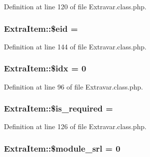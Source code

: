 Definition at line 120 of file Extravar.\+class.\+php.

\subsubsection[{\texorpdfstring{\$eid}{$eid}}]{\setlength{\rightskip}{0pt plus 5cm}Extra\+Item\+::\$eid = \textquotesingle{}\textquotesingle{}}\hypertarget{classExtraItem_a8a68f26bb602679ebf4095e774425092}{}\label{classExtraItem_a8a68f26bb602679ebf4095e774425092}


Definition at line 144 of file Extravar.\+class.\+php.

\subsubsection[{\texorpdfstring{\$idx}{$idx}}]{\setlength{\rightskip}{0pt plus 5cm}Extra\+Item\+::\$idx = 0}\hypertarget{classExtraItem_aadcda4aa903481b261d86bc50ab1c238}{}\label{classExtraItem_aadcda4aa903481b261d86bc50ab1c238}


Definition at line 96 of file Extravar.\+class.\+php.

\subsubsection[{\texorpdfstring{\$is\+\_\+required}{$is_required}}]{\setlength{\rightskip}{0pt plus 5cm}Extra\+Item\+::\$is\+\_\+required = \textquotesingle{}}\hypertarget{classExtraItem_a616da9975ea87e9b61b6b9a2daf5e769}{}\label{classExtraItem_a616da9975ea87e9b61b6b9a2daf5e769}


Definition at line 126 of file Extravar.\+class.\+php.

\subsubsection[{\texorpdfstring{\$module\+\_\+srl}{$module_srl}}]{\setlength{\rightskip}{0pt plus 5cm}Extra\+Item\+::\$module\+\_\+srl = 0}\hypertarget{classExtraItem_a21cce86c0846b13228273314216e5ab9}{}\label{classExtraItem_a21cce86c0846b13228273314216e5ab9}


